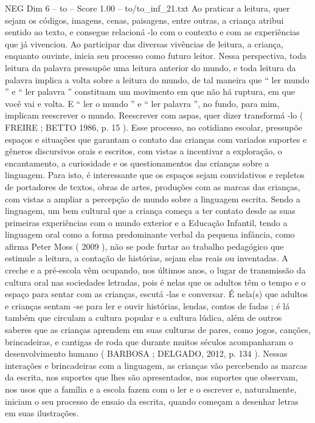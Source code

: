 \begin{textsample}{NEG Dim 6 – to – Score 1.00 – to/to\_inf\_21.txt}
Ao praticar a leitura, quer sejam os códigos, imagens, cenas, paisagens, entre outras, a criança atribui sentido ao texto, e consegue relacioná -lo com o contexto e com as experiências que já vivenciou.
Ao participar das diversas vivências de leitura, a criança, enquanto ouvinte, inicia seu processo como futuro leitor.
Nessa perspectiva, toda leitura da palavra pressupõe uma leitura anterior do mundo, e toda leitura da palavra implica a volta sobre a leitura do mundo, de tal maneira que “ ler mundo ” e “ ler palavra ” constituam um movimento em que não há ruptura, em que você vai e volta.
E “ ler o mundo ” e “ ler palavra ”, no fundo, para mim, implicam reescrever o mundo.
Reescrever com aspas, quer dizer transformá -lo ( FREIRE ; BETTO 1986, p. 15 ).
Esse processo, no cotidiano escolar, pressupõe espaços e situações que garantam o contato das crianças com variados suportes e gêneros discursivos orais e escritos, com vistas a incentivar a exploração, o encantamento, a curiosidade e os questionamentos das crianças sobre a linguagem.
Para isto, é interessante que os espaços sejam convidativos e repletos de portadores de textos, obras de artes, produções com as marcas das crianças, com vistas a ampliar a percepção de mundo sobre a linguagem escrita.
Sendo a linguagem, um bem cultural que a criança começa a ter contato desde as suas primeiras experiências com o mundo exterior e a Educação Infantil, tendo a linguagem oral como a forma predominante verbal da pequena infância, como afirma Peter Moss ( 2009 ), não se pode furtar ao trabalho pedagógico que estimule a leitura, a contação de histórias, sejam elas reais ou inventadas.
A creche e a pré-escola vêm ocupando, nos últimos anos, o lugar de transmissão da cultura oral nas sociedades letradas, pois é nelas que os adultos têm o tempo e o espaço para sentar com as crianças, escutá -las e conversar.
É nela(s) que adultos e crianças sentam -se para ler e ouvir histórias, lendas, contos de fadas ; é lá também que circulam a cultura popular e a cultura lúdica, além de outros saberes que as crianças aprendem em suas culturas de pares, como jogos, canções, brincadeiras, e cantigas de roda que durante muitos séculos acompanharam o desenvolvimento humano ( BARBOSA ; DELGADO, 2012, p. 134 ).
Nessas interações e brincadeiras com a linguagem, as crianças vão percebendo as marcas da escrita, nos suportes que lhes são apresentados, nos suportes que observam, nos usos que a família e a escola fazem com o ler e o escrever e, naturalmente, iniciam o seu processo de ensaio da escrita, quando começam a desenhar letras em suas ilustrações.

\end{textsample}
